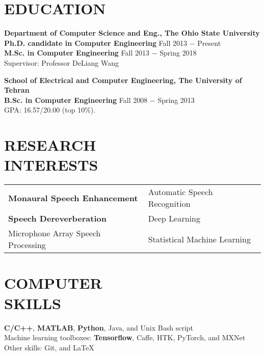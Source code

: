 \documentclass[margin, 10pt]{res}
\begin{document}
\begin{resume}

\section{EDUCATION}
\textbf{Department of Computer Science and Eng., The Ohio State University }  \\
\textbf{Ph.D. candidate in Computer Engineering} \hfill Fall 2013 $-$ Present \\
\textbf{M.Sc. in Computer Engineering} \hfill Fall 2013 $-$ Spring 2018 \\
Supervisor: Professor DeLiang Wang

\textbf{School of Electrical and Computer Engineering, The University of Tehran}\\
\textbf{B.Sc. in Computer Engineering} \hfill Fall 2008 $-$ Spring 2013 \\
GPA: 16.57/20.00 (top 10\%).


\section{RESEARCH\\INTERESTS}
\begin{tabular}{l l}
\textbf{Monaural Speech Enhancement}    & \hspace{0.3in}   Automatic Speech Recognition\\ 
\textbf{Speech Dereverberation}    & \hspace{0.3in}    Deep Learning\\ 
Microphone Array Speech Processing  & \hspace{0.3in} Statistical Machine Learning
\end{tabular}

\section{COMPUTER \\ SKILLS}
\textbf{C/C++}, \textbf{MATLAB}, \textbf{Python}, Java, and Unix Bash script\\
Machine learning toolboxes: \textbf{Tensorflow},
Caffe, HTK, PyTorch, and MXNet\\
Other skills: Git, and \LaTeX



\end{resume}
\end{document}
